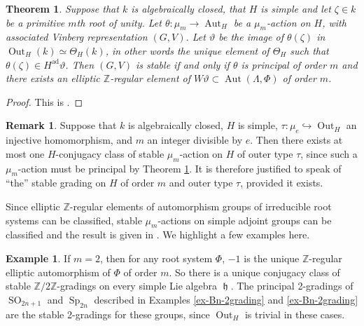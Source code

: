 \documentclass{article} %
\newtheorem{theorem}[proposition]{Theorem}
\numberwithin{equation}{section}
\theoremstyle{definition}
\newtheorem{remark}[proposition]{Remark}
\newtheorem{example}[proposition]{Example}
\DeclareMathOperator{\Sp}{Sp}
\DeclareMathOperator{\SO}{SO}
\DeclareMathOperator{\lieh}{\mathfrak{h}}
\DeclareMathOperator{\Aut}{Aut}
\DeclareMathOperator{\Out}{Out}
\newcommand{\Z}{\mathbb{Z}}
\begin{document}
\begin{theorem}\label{theorem: characterization stable gradings}
Suppose that $k$ is algebraically closed, that $H$ is simple and let $\zeta \in k$ be a primitive $m$th root of unity.
Let $\theta\colon \mu_m\rightarrow \Aut_H$ be a $\mu_m$-action on $H$, with associated Vinberg representation $(G,V)$.
Let $\vartheta$ be the image of $\theta(\zeta)$ in $\Out_H(k)\simeq \Theta_H(k)$, in other words the unique element of $\Theta_H$ such that $\theta(\zeta)\in H^{\mathrm{ad}} \vartheta$. 
Then $(G,V)$ is stable if and only if $\theta$ is principal of order $m$ and there exists an elliptic $\Z$-regular element of $W\vartheta\subset \Aut(\Lambda, \Phi)$ of order $m$.
\end{theorem}


\begin{proof}
    This is \cite[Corollary 14]{GrossLevyReederYu-GradingsPosRank}.
\end{proof}



\begin{remark}
    Suppose that $k$ is algebraically closed, $H$ is simple, $\tau\colon \mu_e\hookrightarrow \Out_H$ an injective homomorphism, and $m$ an integer divisible by $e$.
    Then there exists at most one $H$-conjugacy class of stable $\mu_m$-action on $H$ of outer type $\tau$, since such a $\mu_m$-action must be principal by Theorem \ref{theorem: characterization stable gradings}.
    It is therefore justified to speak of ``the'' stable grading on $H$ of order $m$ and outer type $\tau$, provided it exists.
\end{remark}



Since elliptic $\Z$-regular elements of automorphism groups of irreducible root systems can be classified, stable $\mu_m$-actions on simple adjoint groups can be classified and the result is given in \cite[Section 8]{GrossLevyReederYu-GradingsPosRank}.
We highlight a few examples here. 


\begin{example}\label{ex-m=2-stable}
    If $m=2$, then for any root system $\Phi$, $-1$ is the unique $\Z$-regular elliptic automorphism of $\Phi$ of order $m$.
    So there is a unique conjugacy class of stable $\Z/2\Z$-gradings on every simple Lie algebra $\lieh$. The principal 2-gradings of $\SO_{2n + 1}$ and $\Sp_{2n}$ described in Examples \ref{ex-Bn-2grading} and \ref{ex-Bn-2grading} are the stable 2-gradings for these groups, since $\Out_H$ is trivial in these cases.
\end{example}
\end{document}
